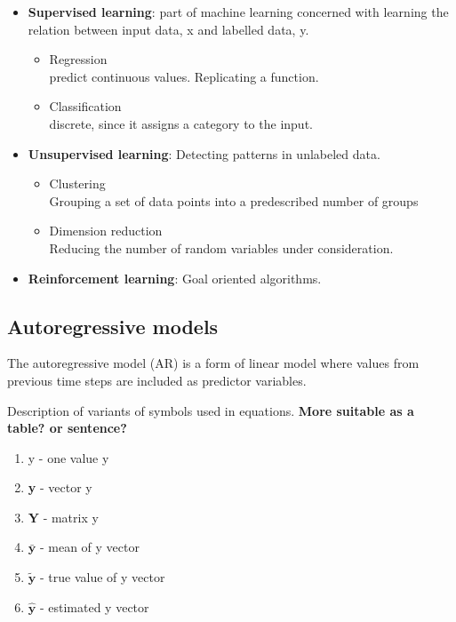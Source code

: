 \begin{itemize}
    \item \textbf{Supervised learning}: part of machine learning concerned with learning the relation between input data, x and labelled data, y.
    \begin{itemize}
        \item Regression\\predict continuous values. Replicating a function.
        \item Classification\\discrete, since it assigns a category to the input.
    \end{itemize}
    \item \textbf{Unsupervised learning}: Detecting patterns in unlabeled data.
    \begin{itemize}
        \item Clustering\\Grouping a set of data points into a predescribed number of groups
        \item Dimension reduction\\Reducing the number of random variables under consideration.
    \end{itemize}
    \item \textbf{Reinforcement learning}: Goal oriented algorithms.
\end{itemize}

\subsection{Autoregressive models} \label{sec:ARmodels}
The autoregressive model (AR) is a form of linear model where values from previous time steps are included as predictor variables. 

Description of variants of symbols used in equations. \textbf{More suitable as a table? or sentence?}
\begin{enumerate}
    \item y - one value y
    \item \textbf{y} - vector y
    \item \textbf{Y} - matrix y
    \item $\bar{\textbf{y}}$   - mean of y vector
    \item $\tilde{\textbf{y}}$ - true value of y vector 
    \item $\hat{\textbf{y}}$   - estimated y vector
\end{enumerate}

